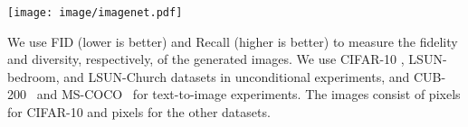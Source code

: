 \documentclass{article} \usepackage{iclr2023_conference,times}
\theoremstyle{plain}
\theoremstyle{definition}
\theoremstyle{remark}
\begin{document}
{\begin{table}[t]
\begin{minipage}[t]{0.48\linewidth}
\centering
\small 
\caption{\small {Results of ImageNet-6464, evaluated with FID and Recall. TDPM+ is built with a pre-trained ADM and an implicit model trained at  using StylGAN-XL.}}\vspace{-2mm}
\label{tab:imagenet}
\centering
{}
\end{minipage}
\hfill
\begin{minipage}[t]{0.48\linewidth}
\vspace{0mm}
\centering
\texttt{[image: image/imagenet.pdf]}\vspace{-3mm}
\label{fig:imagenet}
\end{minipage}\vspace{-8mm}
\end{table}







We use FID (lower is better) and Recall (higher is better) to measure the fidelity and diversity, respectively, of the generated images. We use CIFAR-10 \citep{cifar10}, LSUN-bedroom, and LSUN-Church \citep{lsun} datasets in unconditional experiments, and CUB-200~\citep{cub} and MS-COCO~\citep{mscoco} for text-to-image experiments. The images consist of  pixels for CIFAR-10 and  pixels for the other datasets. 


}
\end{document}
